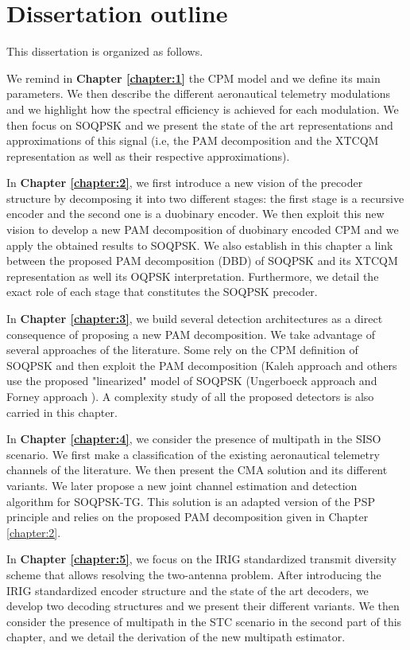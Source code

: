 \section*{Dissertation outline}
This dissertation is organized as follows.

We remind in \textbf{Chapter \ref{chapter:1}} the CPM model and we define its main parameters. We then describe the different aeronautical telemetry modulations and we highlight how the spectral efficiency is achieved for each modulation. We then focus on SOQPSK and we present the state of the art representations and approximations of this signal (i.e, the PAM decomposition and the XTCQM representation as well as their respective approximations).  

In \textbf{Chapter \ref{chapter:2}}, we first introduce a new vision of the precoder structure by decomposing it into two different stages: the first stage is a recursive encoder and the second one is a duobinary encoder. We then exploit this new vision to develop a new PAM decomposition of duobinary encoded CPM and we apply the obtained results to SOQPSK. We also establish in this chapter a link between the proposed PAM decomposition (DBD) of SOQPSK and its XTCQM representation as well its OQPSK interpretation. Furthermore, we detail the exact role of each stage that constitutes the SOQPSK precoder.

In \textbf{Chapter \ref{chapter:3}}, we build several detection architectures as a direct consequence of proposing a new PAM decomposition. We take advantage of several approaches of the literature. Some rely on the CPM definition of SOQPSK and then exploit the PAM decomposition (Kaleh approach \cite{simple_coherent} and others use the proposed "linearized" model of SOQPSK (Ungerboeck approach \cite{mlse_pam} and Forney approach \cite{forney_mlse}). A complexity study of all the proposed detectors is also carried in this chapter. 

In \textbf{Chapter \ref{chapter:4}}, we consider the presence of multipath in the SISO scenario. We first make a classification of the existing aeronautical telemetry channels of the literature. We then present the CMA solution and its different variants. We later propose a new joint channel estimation and detection algorithm for SOQPSK-TG. This solution is an adapted version of the PSP principle and relies on the proposed PAM decomposition given in Chapter \ref{chapter:2}.

In \textbf{Chapter \ref{chapter:5}}, we focus on the IRIG standardized transmit diversity scheme that allows resolving the two-antenna problem. After introducing the IRIG standardized encoder structure and the state of the art decoders, we develop two decoding structures and we present their different variants. We then consider the presence of multipath in the STC scenario in the second part of this chapter, and we detail the derivation of the new multipath estimator.     

